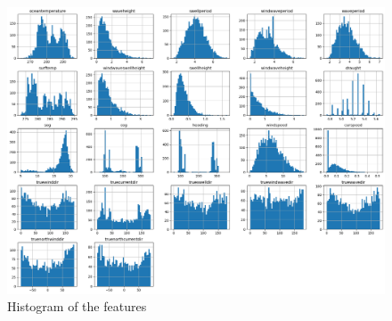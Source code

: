 \begin{figure}
    \includegraphics[width=\linewidth,height=\textheight,keepaspectratio]{02_figures/outputhist.png}
    \caption{Histogram of the features}
    \label{sidewaysfig:hist1}
\end{figure}

\newpage

